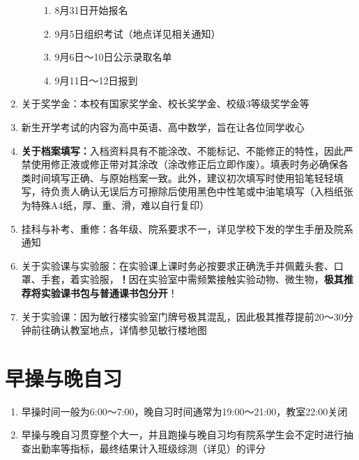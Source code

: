 \begin{enumerate}
\begin{enumerate}
\begin{enumerate}
                        \item 8月31日开始报名
                        \item 9月5日组织考试（地点详见相关通知）
                        \item 9月6日～10日公示录取名单\footnotemark
                        \item 9月11日～12日报到
                    \end{enumerate}
          \end{enumerate}
    \item 关于奖学金\footnotemark：本校有国家奖学金、校长奖学金、校级3等级奖学金等
    \item 新生开学考试\footnotemark 的内容为高中英语、高中数学，旨在让各位同学收心
    \item \textbf{关于档案填写：}入档资料具有不能涂改、不能标记、不能修正的特性，因此严禁使用修正液或修正带对其涂改（涂改修正后立即作废）。填表时务必确保各类时间填写正确、与原始档案一致。此外，建议初次填写时使用铅笔轻轻填写，待负责人确认无误后方可擦除后使用黑色中性笔或中油笔填写（入档纸张为特殊A4纸，厚、重、滑，难以自行复印）
    \item 挂科与补考、重修：各年级、院系要求不一，详见学校下发的学生手册及院系通知
    \item 关于实验课与实验服：在实验课上课时务必按要求正确洗手并佩戴头套、口罩、手套，着实验服，\textbf{！}因在实验室中需频繁接触实验动物、微生物，\textbf{极其推荐将实验课书包与普通课书包分开}！
          \label{schoolbag}
    \item 关于实验课：因为敏行楼实验室门牌号极其混乱，因此极其推荐提前20～30分钟前往确认教室地点，详情参见敏行楼地图
\end{enumerate}

\section[早操与晚自习]{早操与晚自习}
\begin{enumerate}
    \item 早操时间一般为6:00～7:00，晚自习时间通常为19:00～21:00，教室22:00关闭
    \item 早操与晚自习贯穿整个大一\footnotemark，并且跑操与晚自习均有院系学生会不定时进行抽查出勤率等指标，最终结果计入班级综测（详见）的评分
\end{enumerate}

